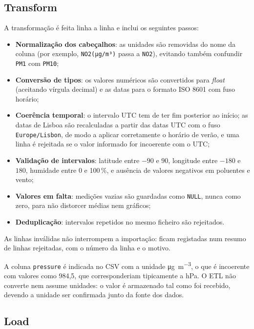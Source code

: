 \subsection{Transform}
\label{sec:etl-transform}


A transformação é feita linha a linha e inclui os seguintes passos:
 
\begin{itemize}
  \item \textbf{Normalização dos cabeçalhos}: as unidades são removidas do nome da coluna (por exemplo, \texttt{NO2(µg/m³)} passa a \texttt{NO2}), evitando também confundir \texttt{PM1} com \texttt{PM10};
  \item \textbf{Conversão de tipos}: os valores numéricos são convertidos para \textit{float} (aceitando vírgula decimal) e as datas para o formato ISO 8601 com fuso horário;
  \item \textbf{Coerência temporal}: o intervalo UTC tem de ter fim posterior ao início; as datas de Lisboa são recalculadas a partir das datas UTC com o fuso \texttt{Europe/Lisbon}, de modo a aplicar corretamente o horário de verão, e uma linha é rejeitada se o valor informado for incoerente com o UTC;
  \item \textbf{Validação de intervalos}: latitude entre $-90$ e $90$, longitude entre $-180$ e $180$, humidade entre 0 e 100\,\%, e ausência de valores negativos em poluentes e vento;
  \item \textbf{Valores em falta}: medições vazias são guardadas como \texttt{NULL}, nunca como zero, para não distorcer médias nem gráficos;
  \item \textbf{Deduplicação}: intervalos repetidos no mesmo ficheiro são rejeitados.
\end{itemize}
 
As linhas inválidas não interrompem a importação: ficam registadas num resumo de linhas rejeitadas, com o número da linha e o motivo.
 
A coluna \texttt{pressure} é indicada no CSV com a unidade \si{\micro\gram\per\cubic\metre}, o que é incoerente com valores como 984,5, que corresponderiam tipicamente a hPa. O ETL não converte nem assume unidades: o valor é armazenado tal como foi recebido, devendo a unidade ser confirmada junto da fonte dos dados.
 
 \subsection{Load}
\label{sec:etl-load}
 
